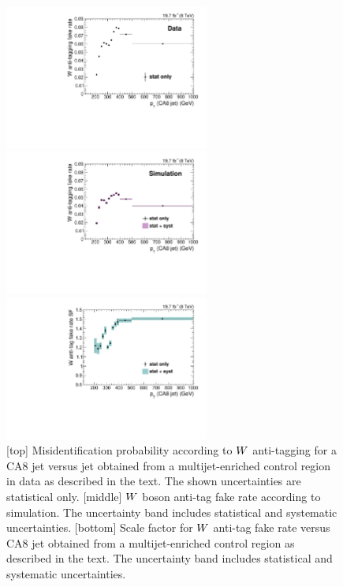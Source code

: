 \begin{figure}[htbp]
\centering
\includegraphics[width=0.6\textwidth]
{figures/razor_wtag/Eff_Data_ratio_pt_antitagged_all_Data_Thesis}

\includegraphics[width=0.6\textwidth]{figures/razor_wtag/Eff_MC_ratio_pt_antitagged_all_MC_Thesis}

\includegraphics[width=0.6\textwidth]{figures/razor_wtag/SF_Wantitagged_Thesis}
\caption{[top] Misidentification probability according to $W$ anti-tagging for a CA8 jet versus jet
\pt obtained from a multijet-enriched control region in data as described in the text. The shown
uncertainties are statistical only.
[middle] $W$ boson anti-tag fake rate according to simulation. The uncertainty band includes
statistical and systematic uncertainties. 
[bottom] Scale factor for $W$ anti-tag fake rate versus CA8 jet \pt obtained from a
multijet-enriched control region as described in the text. The uncertainty band includes
statistical and systematic uncertainties.
\label{fig:boost_wantitag}}
\end{figure}


